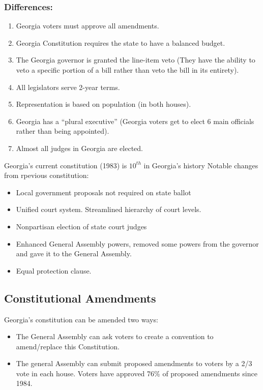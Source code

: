 \subsubsection{Differences:}
\begin{enumerate}
    \item Georgia voters must approve all amendments.
    \item Georgia Constitution requires the state to have a balanced budget.
    \item The Georgia governor is granted the line-item veto (They have the ability to veto a specific portion of a bill rather than veto the bill in its entirety).
    \item All legislators serve 2-year terms.
    \item Representation is based on population (in both houses).
    \item Georgia has a ``plural executive'' (Georgia voters get to elect 6 main officials rather than being appointed).
    \item Almost all judges in Georgia are elected.
\end{enumerate}
Georgia's current constitution (1983) is $10^{th}$ in Georgia's history
Notable changes from rpevious constitution:
\begin{itemize}
    \item Local government proposals not required on state ballot
    \item Unified court system. Streamlined hierarchy of court levels.
    \item Nonpartisan election of state court judges
    \item Enhanced General Assembly powers, removed some powers from the governor and gave it to the General Assembly.
    \item Equal protection clause.
\end{itemize}
\subsection{Constitutional Amendments}
Georgia's constitution can be amended two ways:
\begin{itemize}
    \item The General Assembly can ask voters to create a convention to amend/replace this Constitution.
    \item The general Assembly can submit proposed amendments to voters by a 2/3 vote in each house. Voters have approved 76\% of proposed amendments since 1984.
\end{itemize}
